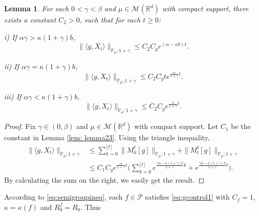 \documentclass[12pt, a4paper]{amsart}
\newtheorem{lem}[thm]{Lemma}
\theoremstyle{definition}
\numberwithin{equation}{section}
\begin{document}
\begin{lem}\label{lemma24}
For each $0 < \gamma < \beta$ and $\mu\in \mathcal M(\mathbb R^d)$ with compact support, there exists a constant $C_2>0$, such that for each $t\geq 0$:

i) If $\alpha\gamma > \kappa (1+\gamma)b$,
$$\|\langle g,X_t\rangle\|_{\mathbb{P}_{\mu};1+\gamma}\leq C_2 C_g e^{(\alpha-\kappa b)t}.$$

ii) If  $\alpha\gamma = \kappa (1+\gamma)b$,
$$\|\langle g,X_t\rangle\|_{\mathbb{P}_{\mu};1+\gamma}\leq C_2 C_g te^{\frac{\alpha}{1+\gamma}t}.$$

iii) If $\alpha\gamma < \kappa (1+\gamma)b$,
$$\|\langle g,X_t\rangle\|_{\mathbb{P}_{\mu};1+\gamma}\leq C_2 C_g e^{\frac{\alpha}{1+\gamma}t}.$$

\end{lem}
\begin{proof}
    Fix $\gamma \in (0,\beta)$ and $\mu \in \mathcal M(\mathbb R^d)$ with compact support.
    Let $C_1$ be the constant in Lemma \ref{lem: lemma23}.
    Using the triangle inequality,
\begin{align}
    \|\langle g,X_t\rangle\|_{\mathbb P_\mu;1+\gamma}
    &\leq \sum_{k=0}^{\lfloor t\rfloor}\|M_k^t[g]\|_{\mathbb P_\mu;1+\gamma}+\|M_t^t[g]\|_{\mathbb P_\mu;1+\gamma}
    \\ &\leq C_1 C_g e^{\frac{\alpha}{1+\gamma}t}\Big(\sum_{k=0}^{\lfloor t\rfloor} e^{\frac{\gamma\alpha-\kappa (1+\gamma)b}{1+\gamma}k}+e^{\frac{\gamma\alpha-\kappa (1+\gamma)b}{1+\gamma}t}\Big).
\end{align}
By calculating the sum on the right, we easily get the result.
\end{proof}
According to \eqref{eq:semigroupineq}, each $f \in \mathcal{P}$ satisfies \eqref{eq:gcontrol1} with $C_f=1$, $\kappa=\kappa(f)$ and $R_0^f=R_0$. Thus 
\end{document}
